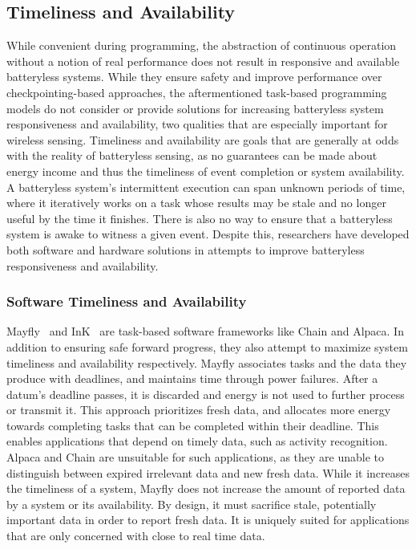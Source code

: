 \subsection{Timeliness and Availability}
While convenient during programming, the abstraction of continuous operation without a notion of real performance does not result in responsive and available batteryless systems.
While they ensure safety and improve performance over checkpointing-based approaches, the aftermentioned task-based programming models
do not consider or provide solutions for increasing batteryless system responsiveness and availability,
two qualities that are especially important for wireless sensing.
Timeliness and availability are goals that are generally at odds with the reality of batteryless sensing, as no guarantees can be made about energy income and thus the timeliness of event completion or system availability.
A batteryless system's intermittent execution can span unknown periods of time, where it iteratively works on a task whose results may be stale and no longer useful by the time it finishes. There is also no way to ensure that a batteryless system is awake to witness a given event.
Despite this, researchers have developed both software and hardware solutions in attempts to improve batteryless responsiveness and availability.

\subsubsection{Software Timeliness and Availability}
Mayfly~\cite{hesterTimely17} and InK~\cite{yildirim2018ink} are task-based software frameworks like Chain and Alpaca. In addition to ensuring safe forward progress, they also attempt to maximize system timeliness and availability respectively. Mayfly associates tasks and the data they produce with deadlines, and maintains time through power failures.
After a datum's deadline passes, it is discarded and energy is not used to further process or transmit it.
This approach prioritizes fresh data, and allocates more energy towards completing tasks that can be completed within their deadline.
This enables applications that depend on timely data, such as activity recognition. Alpaca and Chain are unsuitable for such applications, as they are unable to distinguish between expired irrelevant data and new fresh data.
While it increases the timeliness of a system, Mayfly does not increase the amount of reported data by a system or its availability. By design, it must sacrifice stale, potentially important data in order to report fresh data.
It is uniquely suited for applications that are only concerned with close to real time data.

